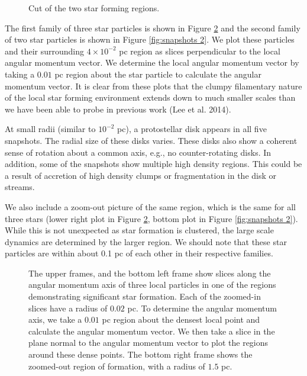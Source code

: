 \documentclass{emulateapj}
\begin{document}
\begin{figure}
\caption{Cut of the two star forming regions.\label{fig:star forming regions}}
\end{figure}

The first family of three star particles is shown in Figure \ref{fig:snapshots} and the second family of two star particles is shown in Figure \ref{fig:snapshots 2}.  We plot these particles and their surrounding $4\times 10^{-2}$ pc region as slices perpendicular to the local angular momentum vector.  We determine the local angular momentum vector by taking a $0.01$ pc region about the star particle to calculate the angular momentum vector.  It is clear from these plots that the clumpy filamentary nature of the local star forming environment extends down to much smaller scales than we have been able to probe in previous work (Lee et al. 2014).  

At small radii (similar to $10^{-2}$ pc), a protostellar disk appears in all five snapshots. The radial size of these disks varies. These disks also show a coherent sense of rotation about a common axis, e.g., no counter-rotating disks. In addition, some of the snapshots show multiple high density regions.  This could be a result of accretion of high density clumps or fragmentation in the disk or streams.  

We also include a zoom-out picture of the same region, which is the same for all three stars (lower right plot in Figure \ref{fig:snapshots}, bottom plot in Figure \ref{fig:snapshots 2}).  While this is not unexpected as star formation is clustered, the large scale dynamics are determined by the larger region.  We should note that these star particles are within about 0.1 pc of each other in their respective families.  

\begin{figure}
\caption{The upper frames, and the bottom left frame show slices along the angular momentum axis of three local particles in one of the regions demonstrating significant star formation.  Each of the zoomed-in slices have a radius of $0.02$ pc.  To determine the angular momentum axis, we take a $0.01$ pc region about the densest local point and calculate the angular momentum vector.  We then take a slice in the plane normal to the angular momentum vector to plot the regions around these dense points.  The bottom right frame shows the zoomed-out region of formation, with a radius of $1.5$ pc.    \label{fig:snapshots}}
\end{figure}
\end{document}
